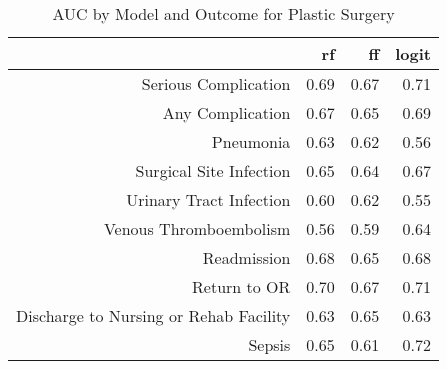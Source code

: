 \begin{table}[ht]
\centering
\begin{tabular}{rrrr}
  \hline
 & rf & ff & logit \\ 
  \hline
Serious Complication & 0.69 & 0.67 & 0.71 \\ 
  Any Complication & 0.67 & 0.65 & 0.69 \\ 
  Pneumonia & 0.63 & 0.62 & 0.56 \\ 
  Surgical Site Infection & 0.65 & 0.64 & 0.67 \\ 
  Urinary Tract Infection & 0.60 & 0.62 & 0.55 \\ 
  Venous Thromboembolism & 0.56 & 0.59 & 0.64 \\ 
  Readmission & 0.68 & 0.65 & 0.68 \\ 
  Return to OR & 0.70 & 0.67 & 0.71 \\ 
  Discharge to Nursing or Rehab Facility & 0.63 & 0.65 & 0.63 \\ 
  Sepsis & 0.65 & 0.61 & 0.72 \\ 
   \hline
\end{tabular}
\caption{AUC by Model and Outcome for Plastic Surgery} 
\end{table}
